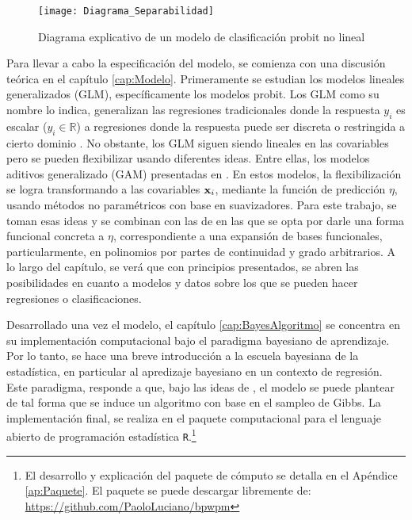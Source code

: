 \documentclass[../Main/Main.tex]{subfiles}
\begin{document}
\begin{figure}[h]
  \centering
      \texttt{[image: Diagrama\_Separabilidad]}
  \caption{Diagrama explicativo de un modelo de clasificación probit no lineal}
  \label{fig:DiagramaIntro}
\end{figure}

Para llevar a cabo la especificación del modelo, se comienza con una discusión teórica en el capítulo \ref{cap:Modelo}. Primeramente se estudian los modelos lineales generalizados (GLM), específicamente los modelos probit. Los GLM como su nombre lo indica, generalizan las regresiones tradicionales donde la respuesta $y_i$ es escalar ($y_i \in \mathbb{R}$) a regresiones donde la respuesta puede ser discreta o restringida a cierto dominio \autocite{maccullagh1989generalized}. No obstante, los GLM siguen siendo lineales en las covariables pero se pueden flexibilizar usando diferentes ideas. Entre ellas, los modelos aditivos generalizado (GAM) presentadas en \citet{hastie1986generalized}. En estos modelos, la flexibilización se logra transformando a las covariables $\mathbf{x}_i$, mediante la función de predicción $\eta$, usando métodos no paramétricos con base en suavizadores. Para este trabajo, se toman esas ideas y se combinan con las de \citet{mallik1998automatic} en las que se opta por darle una forma funcional concreta a $\eta$, correspondiente a una expansión de bases funcionales, particularmente, en polinomios por partes de continuidad y grado arbitrarios.  A lo largo del capítulo, se verá que con principios presentados, se abren las posibilidades en cuanto a modelos y datos sobre los que se pueden hacer regresiones o clasificaciones. %

Desarrollado una vez el modelo, el capítulo \ref{cap:BayesAlgoritmo} se concentra en su implementación computacional bajo el paradigma bayesiano de aprendizaje. Por lo tanto, se hace una breve introducción a la escuela bayesiana de la estadística, en particular al apredizaje bayesiano en un contexto de regresión. Este paradigma, responde a que, bajo las ideas de \citet{albert1993bayesian}, el modelo se puede plantear de tal forma que se induce un algoritmo con base en el sampleo de Gibbs. La implementación final, se realiza en el paquete computacional para el lenguaje abierto de programación estadística \verb|R|.\footnote{El desarrollo y explicación del paquete de cómputo se detalla en el Apéndice \ref{ap:Paquete}. El paquete se puede descargar libremente de: \url{https://github.com/PaoloLuciano/bpwpm}}
\end{document}
